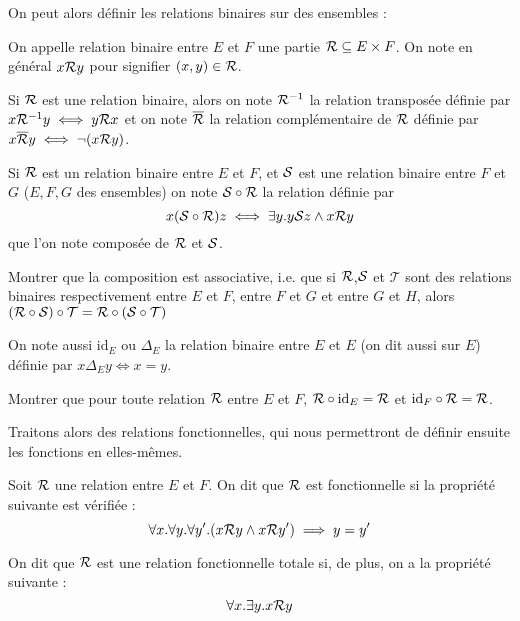 On peut alors définir les relations binaires sur des ensembles :

\begin{defi}
    On appelle relation binaire entre $E$ et $F$ une partie $\mathcal R\subseteq E\times F$. On note en général $x\mathcal R y$ pour signifier $(x,y)\in\mathcal R$.
\end{defi}

\begin{defi}
    Si $\mathcal R$ est une relation binaire, alors on note $\mathcal R^{-1}$ la relation transposée définie par $x\mathcal R^{-1} y \iff y\mathcal R x$ et on note $\overline {\mathcal R}$ la relation complémentaire de $\mathcal R$ définie par $x\overline {\mathcal R} y \iff \lnot (x\mathcal R y)$.

    Si $\mathcal R$ est un relation binaire entre $E$ et $F$, et $\mathcal S$ est une relation binaire entre $F$ et $G$ ($E,F,G$ des ensembles) on note $\mathcal S\circ\mathcal R$ la relation définie par $$x(\mathcal S\circ\mathcal R) z \iff \exists y. y\mathcal S z\land x\mathcal R y$$ que l'on note composée de $\mathcal R$ et $\mathcal S$.
\end{defi}

\begin{exo}
    Montrer que la composition est associative, i.e. que si $\mathcal R$,$\mathcal S$ et $\mathcal T$ sont des relations binaires respectivement entre $E$ et $F$, entre $F$ et $G$ et entre $G$ et $H$, alors $(\mathcal R\circ \mathcal S)\circ\mathcal T = \mathcal R\circ(\mathcal S\circ\mathcal T)$
\end{exo}

\begin{defi}
    On note aussi $\mathrm{id}_E$ ou $\Delta_E$ la relation binaire entre $E$ et $E$ (on dit aussi \og sur $E$\fg{}) définie par $x\Delta_E y \iff x = y$.
\end{defi}

\begin{exo}
    Montrer que pour toute relation $\mathcal R$ entre $E$ et $F$, $\mathcal R\circ \mathrm{id}_E = \mathcal R$ et $\mathrm{id}_F\circ\mathcal R = \mathcal R$.
\end{exo}

Traitons alors des relations fonctionnelles, qui nous permettront de définir ensuite les fonctions en elles-mêmes.

\begin{defi}
    Soit $\mathcal R$ une relation entre $E$ et $F$. On dit que $\mathcal R$ est fonctionnelle si la propriété suivante est vérifiée : $$\forall x.\forall y. \forall y'. (x\mathcal R y\land x\mathcal R y')\implies y=y'$$

    On dit que $\mathcal R$ est une relation fonctionnelle totale si, de plus, on a la propriété suivante : $$\forall x.\exists y. x\mathcal R y$$
\end{defi}

